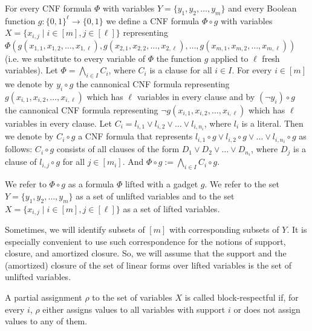 For every CNF formula $\Phi$ with variables $Y=\{y_{1},y_{2},\dots,y_{m}\}$ and every Boolean function
$g\colon\{0,1\}^{\ell}\to\{0,1\}$ we define a CNF formula $\Phi\circ g$ with variables $X=\{x_{i,j}\mid i\in[m],j\in[\ell]\}$ representing
$\Phi(g(x_{1,1},x_{1,2},\dots,x_{1,\ell}),g(x_{2,1},x_{2,2},\dots,x_{2,\ell}),\dots,g(x_{m,1},x_{m,2},\dots,x_{m,\ell}))$ (i.e. we substitute to every variable of $\Phi$ the function $g$ applied to $\ell$
fresh variables). Let $\Phi=\bigwedge\limits_{i\in I}C_{i}$, where $C_{i}$ is a clause for all $i\in I$. For every $i\in[m]$ we denote by $y_{i}\circ g$ the cannonical CNF formula representing $g(x_{i,1},x_{i,2},\dots,x_{i,\ell})$ which has $\ell$ variables in every clause and by $(\lnot y_{i})\circ g$ the cannonical CNF formula representing $\lnot g(x_{i,1},x_{i,2},\dots,x_{i,\ell})$ which has $\ell$ variables in every clause. Let $C_{i}=l_{i,1}\lor l_{i,2}\lor\dots\lor l_{i,n_{i}}$, where $l_{i}$
is a literal. Then we denote by $C_{i}\circ g$ a CNF formula that represents $l_{i,1}\circ g\lor l_{i,2}\circ g\lor\dots\lor l_{i,n_{i}}\circ g$ as follows: $C_{i}\circ g$ consists of all clauses of the form $D_{1}\lor D_{2}\lor\dots\lor D_{n_{i}}$, where $D_{j}$ is a clause of $l_{i,j}\circ g$ for all $j\in[m_{i}]$. And $\Phi\circ g:=\bigwedge\limits_{i\in I}C_{i}\circ g$.\par



We refer to $\Phi\circ g$ as a formula $\Phi$ lifted with a gadget $g$. We refer to the set $Y=\{y_{1},y_{2},\dots,y_{m}\}$ as a set of unlifted variables and to the set $X=\{x_{i,j}\mid i\in[m],j\in[\ell]\}$ as a set of lifted variables.\par



Sometimes, we will identify subsets of $[m]$ with corresponding subsets of $Y$. It is especially convenient to use such correspondence for the notions of support, closure, and amortized closure. So, we will assume that the support and the (amortized) closure of the set of linear forms over lifted variables is the set of unlifted variables.\par



A partial assignment $\rho$ to the set of variables $X$ is called block-respectful if, for every $i$, $\rho$ either assigns values to all variables with support $i$ or does not assign values to any of them.\par



